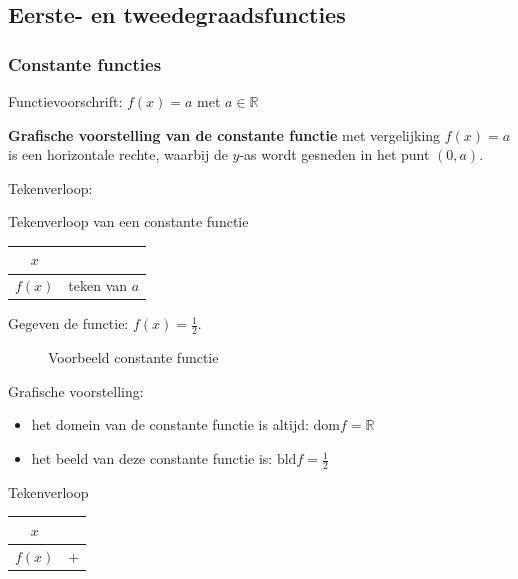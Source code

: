 \subsection{Eerste- en tweedegraadsfuncties}
\label{sec:eerste_tweede}

\subsubsection{Constante functies}

\begin{definitie}
	Functievoorschrift: $f(x)=a$ met $a\in\mathbb{R}$
\end{definitie}


\textbf{Grafische voorstelling van de constante functie}
met vergelijking $f(x)=a$ is een horizontale rechte, waarbij de $y$-as
wordt gesneden in het punt $(0,a)$.


Tekenverloop: 

\begin{tabel}{Tekenverloop van een constante functie}
	\begin{tabular}{c||c}
		$x$ & \\
		\hline 
		$f(x)$ & teken van $a$\\
	\end{tabular}
	\label{tab:ct}
\end{tabel}


\begin{voorbeeld}
	Gegeven de functie: $f(x)=\frac{1}{2}$. 

\begin{figure}[H]
	\centering          
	
	\caption{Voorbeeld constante functie}
	\label{fig:constante_functie}	
\end{figure}
	
 
Grafische voorstelling:
\begin{itemize}
\item het domein van de constante functie is altijd: $\textrm{dom}f=\mathbb{R}$
\item het beeld van deze constante functie is: $\textrm{bld}f=\frac{1}{2}$
\end{itemize}

Tekenverloop

\begin{center}
\begin{tabular}{c||c}
	$x$ & \\
	\hline 
	$f(x)$ & $+$ \\
\end{tabular}	
\end{center}

\end{voorbeeld}

